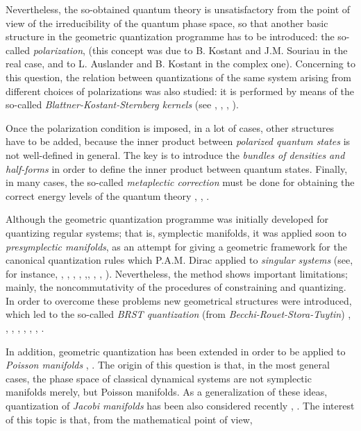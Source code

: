 \documentclass[12pt]{article}
\theoremstyle{plain}
\begin{document}
Nevertheless, the so-obtained quantum theory is unsatisfactory
 from the point of view of the irreducibility of the
quantum phase space, so that another basic structure
in the geometric quantization programme has to be introduced:
the so-called {\it polarization},
(this concept was due to B. Kostant and J.M. Souriau in the real case,
and to L. Auslander and B. Kostant in the complex one).
Concerning to this question, the relation between  quantizations of the
same
system arising from different choices of polarizations
was also studied: it is performed by means of the so-called
{\it Blattner-Kostant-Sternberg kernels}
(see \cite{Bl-73}, \cite{Bl-75}, \cite{Bl-77}, \cite{GS-77}).

Once the polarization condition is imposed,
in a lot of cases, other structures have to be added,
because  the inner product between {\it polarized quantum states}
is not well-defined in general.
The key is to introduce the {\it bundles of densities and half-forms}
\cite{Wn-77}
in order to define the inner product between quantum states.
Finally, in many cases, the so-called {\it metaplectic correction} must
be done
for obtaining the correct energy levels of the quantum theory
\cite{Bl-73}, \cite{GS-77}, \cite{Ko-74}.

Although the geometric quantization programme was initially developed
for quantizing regular systems; that is, symplectic manifolds,
it was applied soon to {\it presymplectic manifolds},
as an attempt for giving a geometric framework for the canonical
quantization
rules which P.A.M. Dirac applied to {\it singular systems}
(see, for instance,  \cite{AS-86}, \cite{Blau-88a}, \cite{Blau-88b},
\cite{Go-86},
\cite{GS-81},\cite{Lo-90}, \cite{Ml-89}, \cite{Sn-83}, \cite{Tu-91}).
Nevertheless, the method shows important limitations;
mainly, the noncommutativity of the procedures of constraining
and quantizing. In order to overcome these problems
new geometrical structures were introduced, which led to the so-called
{\it BRST quantization} (from {\it Becchi-Rouet-Stora-Tuytin})
\cite{ALN-90}, \cite{ALN-91}, \cite{DEGST-91}, \cite{Ib-90},
\cite{Ko-77}, \cite{Lo-92},
\cite{Tu-92a}, \cite{Tu-92b}.

In addition, geometric quantization has been extended in order to be
applied to
{\it Poisson manifolds} \cite{Va-91}, \cite{Va-97}.
The origin of this question is that, in the most general cases,
the phase space of classical dynamical systems are not symplectic
manifolds merely,
but Poisson manifolds. As a generalization of these ideas, quantization
of
{\it Jacobi manifolds}  has been also considered recently \cite{CLM-96},
\cite{LMP-97}.
The interest of this topic is that, from the mathematical point of view,
\end{document}
